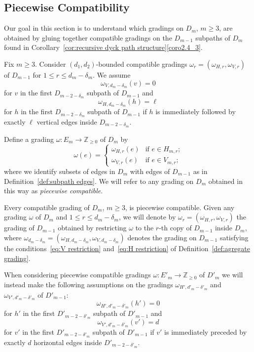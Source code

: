 \documentclass[ALCO,ThmDefs,Unicode,epreuves]{cedram}
\newcommand{\ZZ}{\mathbb{Z}}
\begin{document}
\subsection{Piecewise Compatibility}
\label{sec:piecewise compatibility}
Our goal in this section is to understand which gradings on $D_m$, $m\ge3$, are obtained by gluing together compatible gradings on the $D_{m-1}$ subpaths of $D_m$ found in Corollary~\ref{cor:recursive dyck path structure}\ref {coro2.4_3}.
\begin{definition}
 \label{def:agregate grading}
 Fix $m\ge3$. Consider $(d_1,d_2)$-bounded compatible gradings $\omega_r=(\omega_{H,r},\omega_{V,r})$ of $D_{m-1}$ for $1\le r\le d_m-\delta_m$. We assume
 \begin{equation}
 \label{eq:V restriction}
 \omega_{V,d_m-\delta_m}(v)=0
 \end{equation}
 for $v$ in the first $D_{m-2-\delta_m}$ subpath of $D_{m-1}$ and
 \begin{equation}
 \label{eq:H restriction}
 \omega_{H,d_m-\delta_m}(h)=\ell
 \end{equation}
 for $h$ in the first $D_{m-2-\delta_m}$ subpath of $D_{m-1}$ if $h$ is immediately followed by exactly $\ell$ vertical edges inside $D_{m-2-\delta_m}$. 

 Define a grading $\omega:E_m\to\ZZ_{\ge0}$ of $D_m$ by
 \[\omega(e)=\begin{cases}\omega_{H,r}(e) & \text{if $e\in H_{m,r}$;}\\ \omega_{V,r}(e) & \text{if $e\in V_{m,r}$;}\end{cases}\]
 where we identify subsets of edges in $D_m$ with edges of $D_{m-1}$ as in Definition~\ref{def:subpath edges}. We will refer to any grading on $D_m$ obtained in this way as \emph{piecewise compatible}.
\end{definition}
\begin{remark}
 \label{rem:restricted gradings}
 Every compatible grading of $D_m$, $m\ge3$, is piecewise compatible. 
 Given any grading $\omega$ of $D_m$ and $1\le r\le d_m-\delta_m$, we will denote by $\omega_r=(\omega_{H,r},\omega_{V,r})$ the grading of $D_{m-1}$ obtained by restricting $\omega$ to the $r$-th copy of $D_{m-1}$ inside $D_m$, where $\omega_{d_m-\delta_m}=(\omega_{H,d_m-\delta_m},\omega_{V,d_m-\delta_m})$ denotes the grading on $D_{m-1}$ satisfying the conditions~\eqref{eq:V restriction} and~\eqref{eq:H restriction} of Definition~\ref{def:agregate grading}.
\end{remark}
\begin{remark}
 \label{rem:alternate restrictions}
 When considering piecewise compatible gradings $\omega:E'_m\to\ZZ_{\ge0}$ of $D'_m$ we will instead make the following assumptions on the gradings $\omega_{H',d'_m-\delta'_m}$ and $\omega_{V',d'_m-\delta'_m}$ of $D'_{m-1}$:
 \[\omega_{H',d'_m-\delta'_m}(h')=0\]
 for $h'$ in the first $D'_{m-2-\delta'_m}$ subpath of $D'_{m-1}$ and
 \[\omega_{V',d'_m-\delta'_m}(v')=d\]
 for $v'$ in the first $D'_{m-2-\delta'_m}$ subpath of $D'_{m-1}$ if $v'$ is immediately preceded by exactly $d$ horizontal edges inside $D'_{m-2-\delta'_m}$. 
\end{remark}
\end{document}
